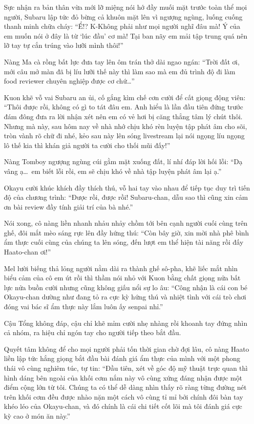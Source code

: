\documentclass[../main.tex]{subfiles}
\begin{document}
Sực nhận ra bản thân vừa mới lỡ miệng nói hớ đầy muối mặt trước toàn thể mọi người, Subaru lập tức đỏ bừng cả khuôn mặt lên vì ngượng ngùng, luống cuống thanh minh chữa cháy: ``Ể!? K-Không phải như mọi người nghĩ đâu mà! Ý của em muốn nói ở đây là từ `lúc đầu' cơ mà! Tại ban nãy em mải tập trung quá nên lỡ tay tự cắn trúng vào lưỡi mình thôi!''

Nàng Ma cà rồng bất lực đưa tay lên ôm trán thở dài ngao ngán: ``Trời đất ơi, mới câu mở màn đã bị líu lưỡi thế này thì làm sao mà em đủ trình độ đi làm food reviewer chuyên nghiệp được cơ chứ\dots''

Kuon khẽ vỗ vai Subaru an ủi, cố gắng kìm chế cơn cười để cất giọng động viên: ``Thôi được rồi, không có gì to tát đâu em. Anh hiểu là lần đầu tiên đứng trước đám đông đưa ra lời nhận xét nên em có vẻ hơi bị căng thẳng tâm lý chút thôi. Nhưng mà này, sau hôm nay về nhà nhớ chịu khó rèn luyện tập phát âm cho sõi, tròn vành rõ chữ đi nhé, kẻo sau này lên sóng livestream lại nói ngọng líu ngọng lô thế kia thì khán giả người ta cười cho thối mũi đấy!''

Nàng Tomboy ngượng ngùng cúi gằm mặt xuống đất, lí nhí đáp lời hối lỗi: ``Dạ vâng ạ\dots\ em biết lỗi rồi, em sẽ chịu khó về nhà tập luyện phát âm lại ạ.''

Okayu cười khúc khích đầy thích thú, vỗ hai tay vào nhau để tiếp tục duy trì tiến độ của chương trình: ``Được rồi, được rồi! Subaru-chan, dẫu sao thì cũng xin cảm ơn bài review đầy tính giải trí của bà nhé.''

Nói xong, cô nàng liền nhanh nhảu nhảy chồm tới bên cạnh người cuối cùng trên ghế, đôi mắt mèo sáng rực lên đầy hứng thú: ``Còn bây giờ, xin mời nhà phê bình ẩm thực cuối cùng của chúng ta lên sóng, đến lượt em thể hiện tài năng rồi đấy Haato-chan ơi!''

Mel lười biếng thả lỏng người nằm dài ra thành ghế sô-pha, khẽ liếc mắt nhìn biểu cảm của cô em út rồi thì thầm nói nhỏ với Kuon bằng chất giọng nửa bất lực nửa buồn cười nhưng cũng không giấu nổi sự lo âu: ``Công nhận là cái con bé Okayu-chan dường như đang tỏ ra cực kỳ hứng thú và nhiệt tình với cái trò chơi đóng vai bác sĩ ẩm thực này lắm luôn ấy senpai nhỉ.''

Cậu Tổng không đáp, cậu chỉ khẽ mỉm cười nhẹ nhàng rồi khoanh tay đứng nhìn cả nhóm, ra hiệu chỉ ngón tay cho người tiếp theo bắt đầu.

Quyết tâm không để cho mọi người phải tốn thời gian chờ đợi lâu, cô nàng Haato liền lập tức hắng giọng bắt đầu bài đánh giá ẩm thực của mình với một phong thái vô cùng nghiêm túc, tự tin: ``Đầu tiên, xét về góc độ mỹ thuật trực quan thì hình dáng bên ngoài của khối cơm nắm này vô cùng xứng đáng nhận được một điểm cộng lớn từ tôi. Chúng ta có thể dễ dàng nhìn thấy rõ ràng từng đường nét trên khối cơm đều được nhào nặn một cách vô cùng tỉ mỉ bởi chính đôi bàn tay khéo léo của Okayu-chan, và đó chính là cái chi tiết cốt lõi mà tôi đánh giá cực kỳ cao ở món ăn này.''
\end{document}
